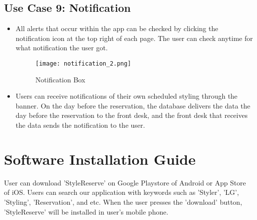 \documentclass[conference]{IEEEtran}
\begin{document}
\newpage
\subsection{Use Case 9: Notification}
\begin{itemize}
    \begin{figure}[htbp]
    \centerline{\texttt{[image: notification\_1.png]}}
    \label{fig}
    \caption{Notification Button}
    \end{figure}
    \item All alerts that occur within the app can be checked by clicking the notification icon at the top right of each page. The user can check anytime for what notification the user got.\\
    
    \begin{figure}[htbp]
    \centerline{\texttt{[image: notification\_2.png]}}
    \label{fig}
    \caption{Notification Box}
    \end{figure}
    \item Users can receive notifications of their own scheduled styling through the banner. On the day before the reservation, the database delivers the data the day before the reservation to the front desk, and the front desk that receives the data sends the notification to the user.\\
\end{itemize}

\section{Software Installation Guide}
User can download ’StyleReserve’ on Google Playstore of Android or App Store of iOS. Users can search our application with keywords such as 'Styler', 'LG', 'Styling', 'Reservation', and
etc. When the user presses the ’download’ button, ’StyleReserve’
will be installed in user’s mobile phone.\\
\end{document}
